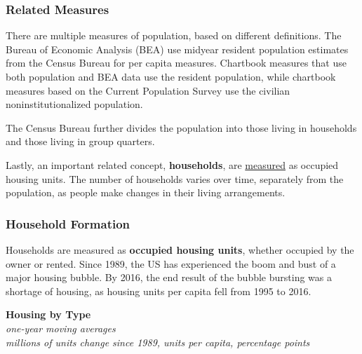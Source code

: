 \documentclass{report}
\begin{document}
{\begin{minipage}{1.0\textwidth}
\subsubsection*{Related Measures}
\small There are multiple measures of population, based on different definitions. The Bureau of Economic Analysis (BEA) use midyear resident population estimates from the Census Bureau for per capita measures. Chartbook measures that use both population and BEA data use the resident population, while chartbook measures based on the Current Population Survey use the civilian noninstitutionalized population. 

The Census Bureau further divides the population into those living in households and those living in group quarters.  

Lastly, an important related concept, \textbf{households}, are \href{https://www.census.gov/housing/hvs/index.html}{measured} as occupied housing units. The number of households varies over time, separately from the population, as people make changes in their living arrangements.  
\end{minipage}
\newpage
\begin{minipage}{1.0\textwidth}    
\subsubsection*{Household Formation}
\small Households are measured as \textbf{occupied housing units}, whether occupied by the owner or rented. Since 1989, the US has experienced the boom and bust of a major housing bubble. By 2016, the end result of the bubble bursting was a shortage of housing, as housing units per capita fell from 1995 to 2016. 
\vspace{1mm}
 
\normalsize \textbf{Housing by Type}\\
\footnotesize{\textit{one-year moving averages}}\\
\footnotesize{\textit{millions of units \hspace{3.2cm} change since 1989, units per capita, percentage points}}
\vspace*{3.9cm}


\end{minipage}}
\end{document}
